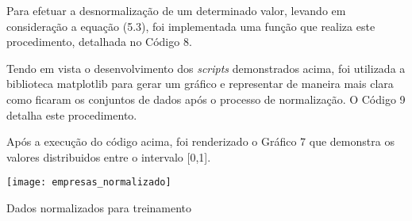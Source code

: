 Para efetuar a desnormalização de um determinado valor, levando em consideração a equação (5.3), foi implementada uma função que realiza este procedimento, detalhada no Código 8.
  

Tendo em vista o desenvolvimento dos \textit{scripts} demonstrados acima, foi utilizada a biblioteca matplotlib para gerar um gráfico e representar de maneira mais clara como ficaram os conjuntos de dados após o processo de normalização. O Código 9 detalha este procedimento.



Após a execução do código acima, foi renderizado o Gráfico 7 que demonstra os valores distribuidos entre o intervalo [0,1].

\begin{grafico}[h]
	\centering
	\centerline{\texttt{[image: empresas\_normalizado]}}
	\caption{Dados normalizados para treinamento}
	\label{exec-intel-coleta}
\end{grafico}